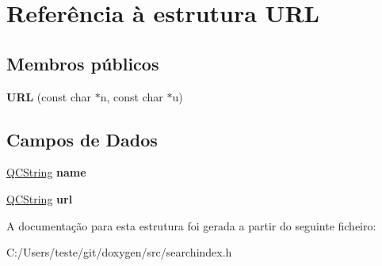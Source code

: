 \hypertarget{struct_u_r_l}{\section{Referência à estrutura U\-R\-L}
\label{struct_u_r_l}
}
\subsection*{Membros públicos}
\begin{DoxyCompactItemize}
\item 
\hypertarget{struct_u_r_l_aedc286135d25249c84cd1968bf766c35}{{\bfseries U\-R\-L} (const char $\ast$n, const char $\ast$u)}\label{struct_u_r_l_aedc286135d25249c84cd1968bf766c35}

\end{DoxyCompactItemize}
\subsection*{Campos de Dados}
\begin{DoxyCompactItemize}
\item 
\hypertarget{struct_u_r_l_adc0097c7bd1e61ad32058fcde425bc7a}{\hyperlink{class_q_c_string}{Q\-C\-String} {\bfseries name}}\label{struct_u_r_l_adc0097c7bd1e61ad32058fcde425bc7a}

\item 
\hypertarget{struct_u_r_l_ae460a12583d5413f9b10d653d645416e}{\hyperlink{class_q_c_string}{Q\-C\-String} {\bfseries url}}\label{struct_u_r_l_ae460a12583d5413f9b10d653d645416e}

\end{DoxyCompactItemize}


A documentação para esta estrutura foi gerada a partir do seguinte ficheiro\-:\begin{DoxyCompactItemize}
\item 
C\-:/\-Users/teste/git/doxygen/src/searchindex.\-h\end{DoxyCompactItemize}
